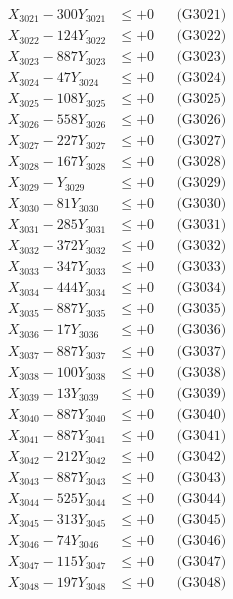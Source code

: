 \documentclass[a4paper,10pt]{article}
\begin{document}
{\begin{align}
\allowbreak
X_{3021} - 300Y_{3021} &\leq +0 && \text{(G3021)} \\
X_{3022} - 124Y_{3022} &\leq +0 && \text{(G3022)} \\
X_{3023} - 887Y_{3023} &\leq +0 && \text{(G3023)} \\
X_{3024} - 47Y_{3024} &\leq +0 && \text{(G3024)} \\
X_{3025} - 108Y_{3025} &\leq +0 && \text{(G3025)} \\
X_{3026} - 558Y_{3026} &\leq +0 && \text{(G3026)} \\
X_{3027} - 227Y_{3027} &\leq +0 && \text{(G3027)} \\
X_{3028} - 167Y_{3028} &\leq +0 && \text{(G3028)} \\
X_{3029} - Y_{3029} &\leq +0 && \text{(G3029)} \\
X_{3030} - 81Y_{3030} &\leq +0 && \text{(G3030)} \\
\allowbreak
X_{3031} - 285Y_{3031} &\leq +0 && \text{(G3031)} \\
X_{3032} - 372Y_{3032} &\leq +0 && \text{(G3032)} \\
X_{3033} - 347Y_{3033} &\leq +0 && \text{(G3033)} \\
X_{3034} - 444Y_{3034} &\leq +0 && \text{(G3034)} \\
X_{3035} - 887Y_{3035} &\leq +0 && \text{(G3035)} \\
X_{3036} - 17Y_{3036} &\leq +0 && \text{(G3036)} \\
X_{3037} - 887Y_{3037} &\leq +0 && \text{(G3037)} \\
X_{3038} - 100Y_{3038} &\leq +0 && \text{(G3038)} \\
X_{3039} - 13Y_{3039} &\leq +0 && \text{(G3039)} \\
X_{3040} - 887Y_{3040} &\leq +0 && \text{(G3040)} \\
\allowbreak
X_{3041} - 887Y_{3041} &\leq +0 && \text{(G3041)} \\
X_{3042} - 212Y_{3042} &\leq +0 && \text{(G3042)} \\
X_{3043} - 887Y_{3043} &\leq +0 && \text{(G3043)} \\
X_{3044} - 525Y_{3044} &\leq +0 && \text{(G3044)} \\
X_{3045} - 313Y_{3045} &\leq +0 && \text{(G3045)} \\
X_{3046} - 74Y_{3046} &\leq +0 && \text{(G3046)} \\
X_{3047} - 115Y_{3047} &\leq +0 && \text{(G3047)} \\
X_{3048} - 197Y_{3048} &\leq +0 && \text{(G3048)} \\

\end{align}}
\end{document}
